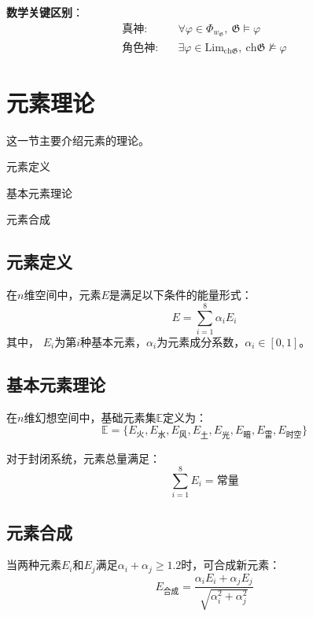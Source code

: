\documentclass[lang=cn,newtx,10pt,scheme=chinese]{elegantbook}
\newcommand{\G}{\mathfrak{G}} %
\begin{document}
\textbf{数学关键区别}：
\begin{align*}
    \text{真神}:  & \quad \forall \varphi \in \varPhi_{w_\G}, \ \G \models \varphi                                                  \\
    \text{角色神}: & \quad \exists \varphi \in \mathrm{Lim}_{\mathrm{ch}\mathfrak{G}}, \ \mathrm{ch}\mathfrak{G} \not\models \varphi
\end{align*}

\section{元素理论}
这一节主要介绍元素的理论。
\begin{introduction}
    \item 元素定义
    \item 基本元素理论
    \item 元素合成
\end{introduction}

\subsection{元素定义}
\begin{definition}[元素]
    在$n$维空间中，元素$E$是满足以下条件的能量形式：
    \[
        E  = \sum_{i=1}^8 \alpha_i E_i
    \]
    其中，
    \(E_i\)为第$i$种基本元素，$\alpha_i$为元素成分系数，$\alpha_i \in [0,1]$。
\end{definition}

\subsection{基本元素理论}
\begin{definition}[元素本源]
    在$n$维幻想空间中，基础元素集$\mathbb{E}$定义为：
    \[
        \mathbb{E} = \{ E_{\text{火}}, E_{\text{水}}, E_{\text{风}}, E_{\text{土}}, E_{\text{光}}, E_{\text{暗}}, E_{\text{雷}}, E_{\text{时空}} \}
    \]
\end{definition}

\begin{axiom}[元素守恒]
    对于封闭系统，元素总量满足：
    \[
        \sum_{i=1}^8 E_i = \text{常量}
    \]
\end{axiom}

\subsection{元素合成}
\begin{definition}[元素合成]
    当两种元素$E_i$和$E_j$满足$\alpha_i + \alpha_j \geq 1.2$时，可合成新元素：
    $$
        E_{\text{合成}} = \frac{\alpha_i E_i + \alpha_j E_j}{\sqrt{\alpha_i^2 + \alpha_j^2}}
    $$
\end{definition}
\end{document}
